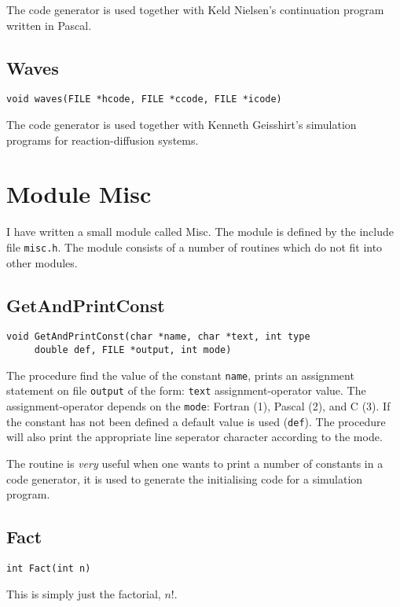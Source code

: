 The code generator is used together with Keld Nielsen's continuation
program written in Pascal.


\subsection{Waves}
\begin{verbatim}
void waves(FILE *hcode, FILE *ccode, FILE *icode)
\end{verbatim}

The code generator is used together with Kenneth Geisshirt's
simulation programs for reaction-diffusion systems.


\newpage
\section{Module Misc}
I have written a small module called Misc. The module is defined by
the include file {\tt misc.h}. The module consists of a number of
routines which do not fit into other modules.

\subsection{GetAndPrintConst}
\begin{verbatim}
void GetAndPrintConst(char *name, char *text, int type
     double def, FILE *output, int mode)
\end{verbatim}

The procedure find the value of the constant {\tt name}, prints an
assignment statement on file {\tt output} of the form: {\tt text}
assignment-operator value. The assignment-operator depends on the
{\tt mode}: Fortran (1), Pascal (2), and C (3). If the constant has
not been defined a default value is used ({\tt def}). The procedure
will also print the appropriate line seperator character according to
the mode. 

The routine is {\em very\/} useful when one wants to print a number of
constants in a code generator, \ie it is used to generate the
initialising code for a simulation program.

\subsection{Fact}
\begin{verbatim}
int Fact(int n)
\end{verbatim}

This is simply just the factorial, \ie $n!$.


